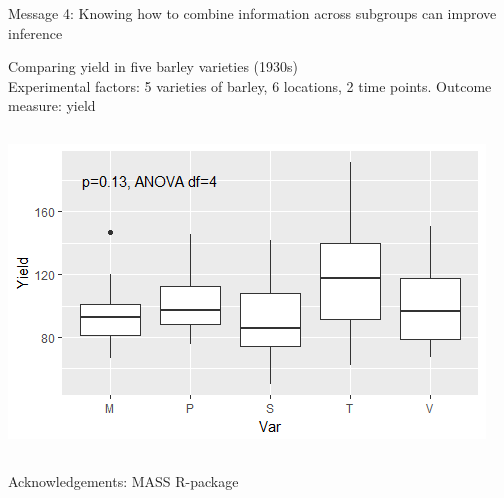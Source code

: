 \documentclass[10pt]{beamer}
\begin{document}
\begin{frame}{Message 4: Knowing how to combine information across subgroups  can improve inference}
 
 \pause 
 
 Comparing yield in five barley varieties (1930s) \\
 Experimental factors: 5 varieties of barley, 6 locations, 2 time points. Outcome measure: yield
  \begin{columns}
    \begin{column}{0.6\textwidth}
	\begin{center}
	\includegraphics[width=\textwidth]{Figures/message4a}
	\end{center}
    \end{column}
    
    \begin{column}{0.4\textwidth}
  
    \end{column}
  \end{columns}
      \tiny Acknowledgements: MASS R-package
   
\end{frame}
\end{document}
